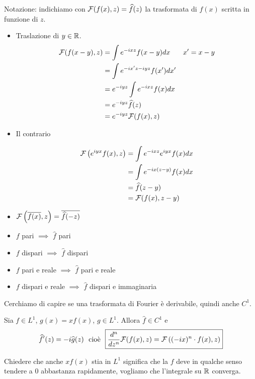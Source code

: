 Notazione: indichiamo con $\mathcal{F}(f(x), z) = \widehat{f}(z)$ la trasformata di $f(x)$ scritta in funzione di $z$.
\begin{itemize}
\item Traslazione di $y\in \mathbb{R}$.
\begin{equation*}
\begin{aligned}
\mathcal{F}(f(x - y), z) & = \int e^{- ixz} f(x - y) dx & x'= x - y\\
 & = \int e^{- ix'z - iyz} f(x') dx' & \\
 & = e^{- iyz}\int e^{- ixz} f(x) dx & \\
 & = e^{- iyz}\widehat{f}(z) & \\
 & = e^{- iyz}\mathcal{F}(f(x), z) &
\end{aligned}
\end{equation*}
\item Il contrario

\begin{equation*}
\begin{aligned}
\mathcal{F}\left(e^{iyx} f(x), z\right) & = \int e^{- ixz} e^{iyx} f(x) dx\\
 & = \int e^{- ix(z - y)} f(x) dx\\
 & = \widehat{f}(z - y)\\
 & = \mathcal{F}(f(x), z - y)
\end{aligned}
\end{equation*}
\item $\mathcal{F}\left(\overline{f(x)}, z\right) = \overline{\widehat{f}(- z)}$
\item $f$ pari $\implies $ $\hat{f}$ pari
\item $f$ dispari $\implies $ $\hat{f}$ dispari
\item $f$ pari e reale $\implies $ $\hat{f}$ pari e reale
\item $f$ dispari e reale $\implies $ $\hat{f}$ dispari e immaginaria
\end{itemize}

Cerchiamo di capire se una trasformata di Fourier è derivabile, quindi anche $C^{1}$.
\begin{thm}
Sia $f\in L^{1}$, $g(x) = xf(x)$, $g\in L^{1}$. Allora $\hat{f} \in C^{1}$ e
\begin{equation*}
\hat{f}'(z) = - i\hat{g}(z) \ \ \text{cioè} \ \ \boxed{\frac{d^{n}}{dz^{n}}\Fc(f(x), z) = \Fc\left((- ix)^{n} \cdot f(x), z\right)}
\end{equation*}
\end{thm}
Chiedere che anche $xf(x)$ stia in $L^{1}$ significa che la $f$ deve in qualche senso tendere a $0$ abbastanza rapidamente, vogliamo che l'integrale su $\mathbb{R}$ converga.

